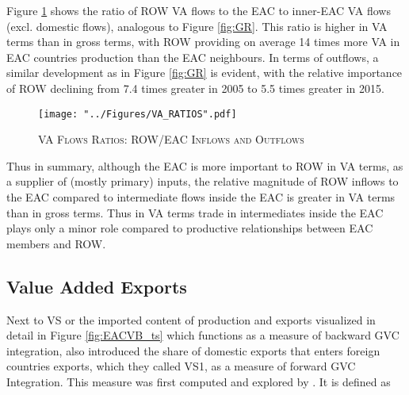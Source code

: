 \documentclass[a4paper]{article}
\begin{document}

Figure \ref{fig:VAR} shows the ratio of ROW VA flows to the EAC to inner-EAC VA flows (excl. domestic flows), analogous to Figure \ref{fig:GR}.  This ratio is higher in VA terms than in gross terms, with ROW providing on average 14 times more VA in EAC countries production than the EAC neighbours. In terms of outflows, a similar development as in Figure \ref{fig:GR} is evident, with the relative importance of ROW declining from 7.4 times greater in 2005 to 5.5 times greater in 2015.  %

\begin{figure}[h!] \vspace{-2mm}
\centering
\caption{\label{fig:VAR}\textsc{VA Flows Ratios: ROW/EAC Inflows and Outflows}}
\texttt{[image: "../Figures/VA\_RATIOS".pdf]} %
\end{figure}
\FloatBarrier


Thus in summary, although the EAC is more important to ROW in VA terms, as a supplier of (mostly primary) inputs, the relative magnitude of ROW inflows to the EAC compared to intermediate flows inside the EAC is greater in VA terms than in gross terms. Thus in VA terms trade in intermediates inside the EAC plays only a minor role compared to productive relationships between EAC members and ROW. 



\subsection{Value Added Exports}


Next to VS or the imported content of production and exports visualized in detail in Figure \ref{fig:EACVB_ts} which functions as a measure of backward GVC integration, \citet{hummels2001nature} also introduced the share of domestic exports that enters foreign countries exports, which they called VS1, as a measure of forward GVC Integration. This measure was first computed and explored by \citet{daudin2011produces}. It is defined as 
\end{document}
